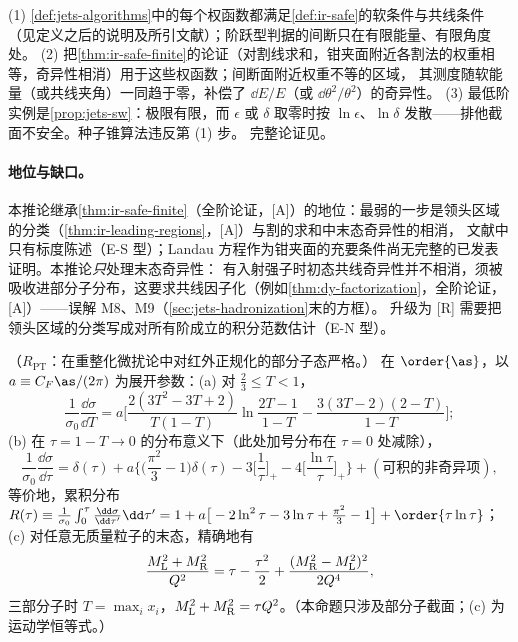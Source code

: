 \begin{proofsketch}
(1) \cref{def:jets-algorithms}中的每个权函数都满足\cref{def:ir-safe}的软条件与共线条件（见定义之后的说明及所引文献）；阶跃型判据的间断只在有限能量、有限角度处。
(2) 把\cref{thm:ir-safe-finite}的论证（对割线求和，钳夹面附近各割法的权重相等，奇异性相消）用于这些权函数；间断面附近权重不等的区域，
其测度随软能量（或共线夹角）一同趋于零，补偿了 $\dd E/E$（或 $\dd\theta^2/\theta^2$）的奇异性\cite{Sterman:1979uw}。
(3) 最低阶实例是\cref{prop:jets-sw}：极限有限，而 $\epsilon$ 或 $\delta$ 取零时按 $\ln\epsilon$、$\ln\delta$ 发散——排他截面不安全。种子锥算法违反第 (1) 步。
完整论证见\cite{Sterman1978a,Sterman1978b,Sterman:1979uw,StermanWeinberg1977}。
\end{proofsketch}

\paragraph{地位与缺口。}
本推论继承\cref{thm:ir-safe-finite}（全阶论证，[A]）的地位：最弱的一步是领头区域的分类（\cref{thm:ir-leading-regions}，[A]）与割的求和中末态奇异性的相消，
文献中只有标度陈述（E-S 型）；Landau 方程作为钳夹面的充要条件尚无完整的已发表证明\cite[第~5.4.3~节]{Collins2011}。本推论\emph{只}处理末态奇异性：
有入射强子时初态共线奇异性并不相消，须被吸收进部分子分布，这要求共线因子化（例如\cref{thm:dy-factorization}，全阶论证，[A]）——误解 M8、M9（\cref{sec:jets-hadronization}末的方框）。
升级为 [R] 需要把领头区域的分类写成对所有阶成立的积分范数估计（E-N 型）。

\begin{proposition}\label{prop:jets-thrust-lo}
（$R_{\mathrm{PT}}$：在重整化微扰论中对红外正规化的部分子态严格。）
在 $\order{\as}$，以 $a\equiv C_F\as/(2\pi)$ 为展开参数：(a) 对 $\frac23\le T<1$，
\begin{equation}\label{eq:jets-thrust-lo}
\frac{1}{\sigma_0}\frac{\dd\sigma}{\dd T}=a\Big[\frac{2(3T^2-3T+2)}{T(1-T)}\ln\frac{2T-1}{1-T}-\frac{3(3T-2)(2-T)}{1-T}\Big];
\end{equation}
(b) 在 $\tau=1-T\to0$ 的分布意义下（此处加号分布在 $\tau=0$ 处减除），
\begin{equation}\label{eq:jets-thrust-sing}
\frac{1}{\sigma_0}\frac{\dd\sigma}{\dd\tau}=\delta(\tau)+a\Big\{\Big(\frac{\pi^2}{3}-1\Big)\delta(\tau)-3\Big[\frac1\tau\Big]_+-4\Big[\frac{\ln\tau}{\tau}\Big]_+\Big\}+(\text{可积的非奇异项}),
\end{equation}
等价地，累积分布 $R(\tau)\equiv\frac1{\sigma_0}\int_0^\tau\frac{\dd\sigma}{\dd\tau'}\dd\tau'=1+a\big[-2\ln^2\tau-3\ln\tau+\frac{\pi^2}{3}-1\big]+\order{\tau\ln\tau}$；
(c) 对任意无质量粒子的末态，精确地有
\begin{equation}\label{eq:jets-hemi}
\frac{M_{\rm L}^2+M_{\rm R}^2}{Q^2}=\tau-\frac{\tau^2}{2}+\frac{(M_{\rm R}^2-M_{\rm L}^2)^2}{2Q^4},
\end{equation}
三部分子时 $T=\max_ix_i$，$M_{\rm L}^2+M_{\rm R}^2=\tau Q^2$。（本命题只涉及部分子截面；(c) 为运动学恒等式。）
\end{proposition}

